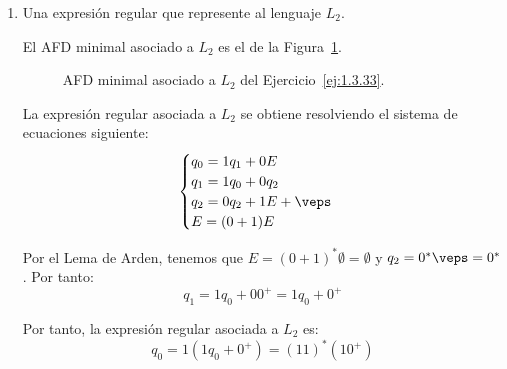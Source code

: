 \begin{ejercicio}
\begin{enumerate}
        \item Una expresión regular que represente al lenguaje $L_2$.
        
        El AFD minimal asociado a $L_2$ es el de la Figura~\ref{fig:1.3.33-L2}.
        \begin{figure}
            \centering
            \caption{AFD minimal asociado a $L_2$ del Ejercicio~\ref{ej:1.3.33}.}
            \label{fig:1.3.33-L2}
        \end{figure}

        La expresión regular asociada a $L_2$ se obtiene resolviendo el sistema de ecuaciones siguiente:
        \begin{equation*}
            \begin{cases}
                q_0 = 1q_1 + 0E\\
                q_1 = 1q_0 + 0q_2\\
                q_2 = 0q_2 + 1E+\veps\\
                E = (0+1)E
            \end{cases}
        \end{equation*}

        Por el Lema de Arden, tenemos que $E=(0+1)^{\ast}\emptyset=\emptyset$ y $q_2=0^*\veps=0^*$. Por tanto:
        \begin{equation*}
            q_1 = 1q_0 + 00^+ = 1q_0+0^+
        \end{equation*}

        Por tanto, la expresión regular asociada a $L_2$ es:
        \begin{equation*}
            q_0=1(1q_0+0^+) = (11)^*(10^+)
        \end{equation*}


\end{enumerate}
\end{ejercicio}
